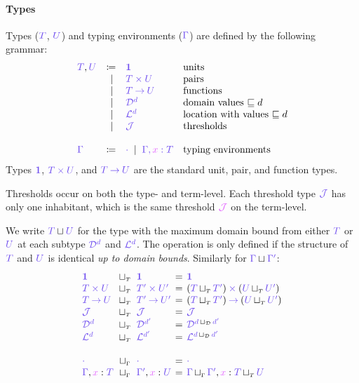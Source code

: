 \documentclass[main.tex]{subfiles}
\begin{document}
\paragraph*{Types}
Types ($\ty{T}$, $\ty{U}$) and typing environments ($\ty{\Gamma}$) are defined by the following grammar:
\[
\begin{array}{lrll}
  \ty{T}, \ty{U}
  & \coloneqq & \ty{\tyunit}        & \text{units} \\
  & \sep      & \ty{\typrod{T}{U}}  & \text{pairs} \\
  & \sep      & \ty{\tyfun{T}{U}}   & \text{functions}\\
  & \sep      & \ty{\tyD{d}}        & \text{domain values }{\sqsubseteq d}\\
  & \sep      & \ty{\tyL{d}}        & \text{location with values }{\sqsubseteq d}\\
  & \sep      & \ty{\tyJ}           & \text{thresholds}
  \\
  \\
  \ty{\Gamma}
  & \coloneqq & \ty{\emptyenv}
    \sep        \ty{\ty{\Gamma},\tmty{x}{T}}
                                    & \text{typing environments}
\end{array}
\]
Types $\ty{\tyunit}$, $\ty{\typrod{T}{U}}$, and $\ty{\tyfun{T}{U}}$ are the standard unit, pair, and function types.


Thresholds occur on both the type- and term-level. Each threshold type $\tyJ$ has only one inhabitant, which is the same threshold $\tmJ$ on the term-level.



We write $\ty{T}\sqcup\ty{U}$ for the type with the maximum domain bound from either $\ty{T}$ or $\ty{U}$ at each subtype $\tyD{d}$ and $\tyL{d}$. The operation is only defined if the structure of $\ty{T}$ and $\ty{U}$ is identical \emph{up to domain bounds}. Similarly for $\ty{\Gamma}\sqcup\ty{\Gamma'}$:
\[
  \setlength{\arraycolsep}{2pt}
  \begin{array}{lclcl}
    \ty{\tyunit} & \sqcupT & \ty{\tyunit}
    & = & \ty{\tyunit}
    \\
    \ty{\typrod{T}{U}} & \sqcupT & \ty{\typrod{T'}{U'}}
    & = & \typrod{(\ty{T}\sqcupT\ty{T'})}{(\ty{U}\sqcupT\ty{U'})}
    \\
    \ty{\tyfun{T}{U}} & \sqcupT & \ty{\tyfun{T'}{U'}}
    & = & \tyfun{(\ty{T}\sqcupT\ty{T'})}{(\ty{U}\sqcupT\ty{U'})}
    \\
    \tyJ & \sqcupT & \tyJ
    & = & \tyJ
    \\
    \tyD{d} & \sqcupT & \tyD{d'}
    & = & \tyD{{d}\sqcupD{d'}}
    \\
    \tyL{d} & \sqcupT & \tyL{d'}
    & = & \tyL{{d}\sqcupD{d'}}
    \\
    \\
    \ty{\emptyenv} & \sqcupG & \ty{\emptyenv}
    & = & \ty{\emptyenv}
    \\
    \ty{\Gamma},\tmty{x}{T} & \sqcupG & \ty{\Gamma'},\tmty{x}{U}
    & = & \ty{\Gamma}\sqcupG\ty{\Gamma'},\tm{x}:{\ty{T}\sqcupT\ty{U}}
  \end{array}
\]
\end{document}
